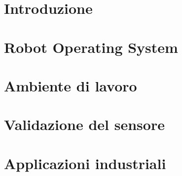 \thispagestyle{empty} %
\cleardoublepage

\thispagestyle{empty}

\clearpage{\pagestyle{plain}\cleardoublepage}


\clearpage{\pagestyle{plain}\cleardoublepage}
\tableofcontents %

\clearpage{\pagestyle{plain}\cleardoublepage} %

\clearpage{\pagestyle{plain}\cleardoublepage} %
\chapter*{Introduzione} %

\clearpage{\pagestyle{plain}\cleardoublepage} %
\chapter{Robot Operating System} %
\label{chapter:chapter1} %

\clearpage{\pagestyle{plain}\cleardoublepage} %
\chapter{Ambiente di lavoro} %
\label{chapter:chapter2} %

\clearpage{\pagestyle{plain}\cleardoublepage} %
\chapter{Validazione del sensore} %
\label{chapter:chapter3} %

\clearpage{\pagestyle{plain}\cleardoublepage} %
\chapter{Applicazioni industriali} %
\label{chapter:chapter4} %

